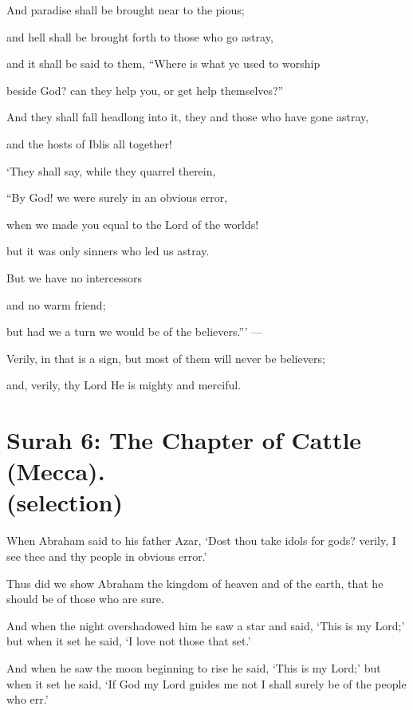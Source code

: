 \documentclass[fontsize=14pt, letterpaper, notitlepage, openany, DIV=12]{scrbook} %
\begin{document}
\noindent[26:90]
And paradise shall be brought near to the pious;

\noindent[26:91]
and hell shall be brought forth to those who go astray,

\noindent[26:92]
and it shall be said to them, ``Where is what ye used to worship

\noindent[26:93]
beside God? can they help you, or get help themselves?''

\noindent[26:94]
And they shall fall headlong into it, they and those who have gone astray,

\noindent[26:95]
and the hosts of Iblis all together!

\noindent[26:96]
`They shall say, while they quarrel therein,

\noindent[26:97]
``By God! we were surely in an obvious error,

\noindent[26:98]
when we made you equal to the Lord of the worlds!

\noindent[26:99]
but it was only sinners who led us astray.

\noindent[26:100]
But we have no intercessors

\noindent[26:101]
and no warm friend;

\noindent[26:102]
but had we a turn we would be of the believers.''\hspace{0.1em}' ---

\noindent[26:103]
Verily, in that is a sign, but most of them will never be believers;

\noindent[26:104]
and, verily, thy Lord He is mighty and merciful.


\section[Surah 6: The Chapter of Cattle (Mecca).]{Surah 6: The Chapter of Cattle (Mecca).\\ (selection)}


\noindent[6:74]
When Abraham said to his father Azar, `Dost thou take idols for gods? verily, I see thee
and thy people in obvious error.'

\noindent[6:75]
Thus did we show Abraham the kingdom of heaven and of the earth, that he should be of
those who are sure.

\noindent[6:76]
And when the night overshadowed him he saw a star and said, `This is my Lord;' but
when it set he said, `I love not those that set.'

\noindent[6:77]
And when he saw the moon beginning to rise he said, `This is my Lord;' but when it set
he said, `If God my Lord guides me not I shall surely be of the people who err.'
\end{document}
